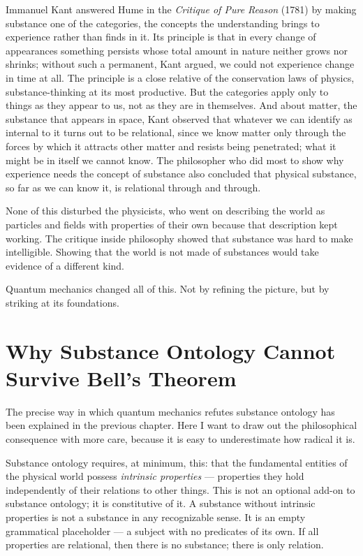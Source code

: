 Immanuel Kant answered Hume in the \textit{Critique of Pure Reason} (1781) by making substance one of the categories, the concepts the understanding brings to experience rather than finds in it. Its principle is that in every change of appearances something persists whose total amount in nature neither grows nor shrinks; without such a permanent, Kant argued, we could not experience change in time at all. The principle is a close relative of the conservation laws of physics, substance-thinking at its most productive. But the categories apply only to things as they appear to us, not as they are in themselves. And about matter, the substance that appears in space, Kant observed that whatever we can identify as internal to it turns out to be relational, since we know matter only through the forces by which it attracts other matter and resists being penetrated; what it might be in itself we cannot know. The philosopher who did most to show why experience needs the concept of substance also concluded that physical substance, so far as we can know it, is relational through and through.

None of this disturbed the physicists, who went on describing the world as particles and fields with properties of their own because that description kept working. The critique inside philosophy showed that substance was hard to make intelligible. Showing that the world is not made of substances would take evidence of a different kind.

Quantum mechanics changed all of this. Not by refining the picture, but by striking at its foundations.

\section{Why Substance Ontology Cannot Survive Bell's Theorem}
\label{sec:ch2-bell-substance}

The precise way in which quantum mechanics refutes substance ontology has been explained in the previous chapter. Here I want to draw out the philosophical consequence with more care, because it is easy to underestimate how radical it is.

Substance ontology requires, at minimum, this: that the fundamental entities of the physical world possess \emph{intrinsic properties} --- properties they hold independently of their relations to other things. This is not an optional add-on to substance ontology; it is constitutive of it. A substance without intrinsic properties is not a substance in any recognizable sense. It is an empty grammatical placeholder --- a subject with no predicates of its own. If all properties are relational, then there is no substance; there is only relation.

